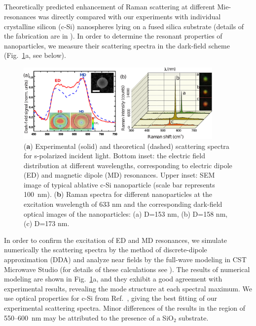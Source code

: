     \subsection{}
        \label{sec:RamanExp}
        Theoretically predicted enhancement of Raman scattering at different Mie-resonances was directly compared with our
        experiments with individual crystalline silicon (c-Si) nanospheres lying on a fused silica substrate (details of the
        fabrication are in ). In order to determine the resonant properties of nanoparticles, we measure
        their scattering spectra in the dark-field scheme (Fig.~\ref{Fig3}a, see  below).

        \begin{figure}[!ht]
            \begin{center}
                \includegraphics[width=0.9\textwidth]{figs/results/enhance/EnhancementExperiment.eps}
            \end{center}
            \label{fig:EnhancementExp}

            \caption{(\textbf{a}) Experimental (solid) and theoretical (dashed) scattering spectra for s-polarized incident light.
            Bottom inset: the electric field distribution at different wavelengths, corresponding to electric dipole (ED) and magnetic
            dipole (MD) resonances. Upper inset: SEM image of typical ablative c-Si nanoparticle (scale bar represents 100~nm). (\textbf{b})
            Raman spectra for different nanoparticles at the excitation wavelength of 633 nm and the corresponding dark-field optical images of the
            nanoparticles: (a) D=153 nm, (b) D=158 nm, (c) D=173 nm.}\label{Fig3}
        \end{figure}

        In order to confirm the excitation of ED and MD resonances, we simulate numerically the scattering spectra by the method of
        discrete-dipole approximation (DDA) and analyze near fields by the full-wave modeling in CST Microwave Studio (for details of
        these calculations see ). The results of numerical modeling are shown in Fig.~\ref{Fig3}a, and they exhibit a
        good agreement with experimental results, revealing the mode structure at each spectral maximum. We use optical properties for
        c-Si from Ref.~\cite{vuye1993temperature}, giving the best fitting of our experimental scattering spectra. Minor differences of the results in
        the region of 550--600~nm may be attributed to the presence of a SiO$_2$ substrate.

